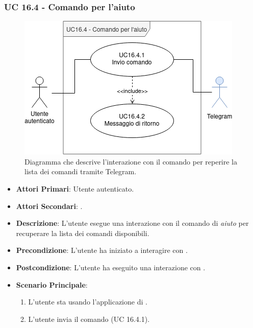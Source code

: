 	\subsubsection{UC 16.4 - Comando per l'aiuto}

	\begin{figure}[H]
		\centering
		\includegraphics[scale=0.60]{res/images/uc16.4}
		\caption{Diagramma che descrive l'interazione con il comando per reperire la lista dei comandi tramite Telegram.}
	\end{figure}

	\begin{itemize}
		\item \textbf{Attori Primari}: Utente autenticato.
		\item \textbf{Attori Secondari}: .
		\item \textbf{Descrizione}: L'utente esegue una interazione con il comando di \textit{aiuto} per recuperare la lista dei comandi disponibili.
		\item \textbf{Precondizione}: L'utente ha iniziato a interagire con .
		\item \textbf{Postcondizione}: L'utente ha eseguito una interazione con .
		\item \textbf{Scenario Principale}:
		\begin{enumerate}
			\item L'utente sta usando l'applicazione di . 
			\item L'utente invia il comando (UC 16.4.1).
		\end{enumerate}
	\end{itemize}

